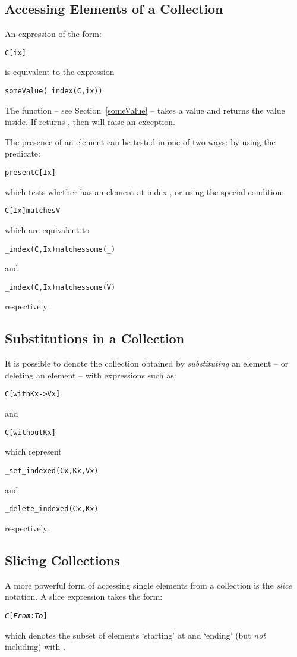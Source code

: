 \subsection{Accessing Elements of a Collection}
An expression of the form:
\begin{alltt}
C[ix]
\end{alltt}
is equivalent to the expression
\begin{alltt}
someValue(\_index(C,ix))
\end{alltt}
\begin{aside}
The  function -- see Section~\vref{someValue} -- takes a  value and returns the value inside. If  returns , then  will raise an exception.
\end{aside}

The presence of an element can be tested in one of two ways: by using the  predicate:
\begin{alltt}
present C[Ix]
\end{alltt}
which tests whether  has an element at index , or using the special condition:
\begin{alltt}
C[Ix] matches V
\end{alltt}
which are equivalent to
\begin{alltt}
_index(C,Ix) matches some(_)
\end{alltt}
and
\begin{alltt}
_index(C,Ix) matches some(V)
\end{alltt}
respectively.
 
\subsection{Substitutions in a Collection}
It is possible to denote the collection obtained by \emph{substituting} an element -- or deleting an element -- with expressions such as:
\begin{alltt}
C[with Kx->Vx]
\end{alltt}
and
\begin{alltt}
C[without Kx]
\end{alltt}
which represent
\begin{alltt}
_set_indexed(Cx,Kx,Vx)
\end{alltt}
and
\begin{alltt}
_delete_indexed(Cx,Kx)
\end{alltt}
respectively.

\subsection{Slicing Collections}
A more powerful form of accessing single elements from a collection is the \emph{slice} notation. A slice expression takes the form:
\begin{alltt}
\emph{C}[\emph{From}:\emph{To}]
\end{alltt}
which denotes the subset of elements `starting' at  and `ending' (but \emph{not} including) with .

